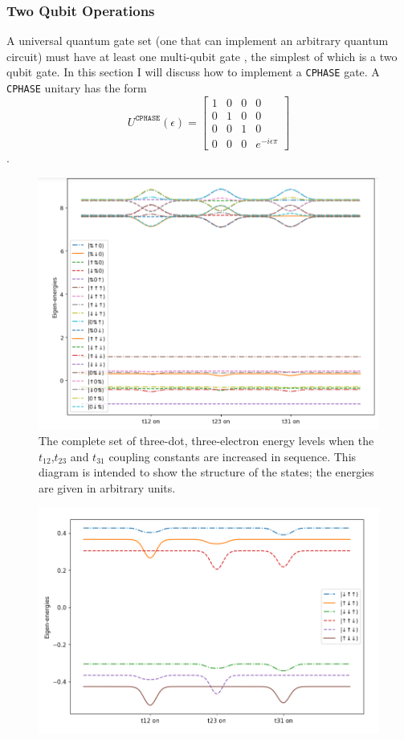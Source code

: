 \documentclass{report}
\begin{document}
\begin{appendices}
\subsubsection{Two Qubit Operations}
A universal quantum gate set (one that can implement an arbitrary quantum circuit) must have at least one multi-qubit gate \cite{deutsch_1995}, the simplest of which is a two qubit gate. In this section I will discuss how to implement a \texttt{CPHASE} gate. A \texttt{CPHASE} unitary has the form
\begin{equation*}
    U^{\texttt{CPHASE}}(\epsilon) = 
\begin{bmatrix}
1 & 0 & 0 & 0\\
0 & 1 & 0 & 0\\
0 & 0 & 1 & 0\\
0 & 0 & 0 & e^{-i\epsilon\pi}
\end{bmatrix}
\end{equation*}. 
\begin{figure}[ht]
    \centering
    \includegraphics[scale = 0.7]{Figures/Energy_levels/elevels1.png}
    \caption{The complete set of three-dot, three-electron energy levels when the $t_{12}$,$t_{23}$ and $t_{31}$ coupling constants are increased in sequence. This diagram is intended to show the structure of the states; the energies are given in arbitrary units.}
    \label{fig:alllevels}
\end{figure}
\begin{figure}[ht]
    \centering
    \includegraphics[scale = 0.7]{Figures/Energy_levels/elevels2.png}

\end{figure}
\end{appendices}
\end{document}

